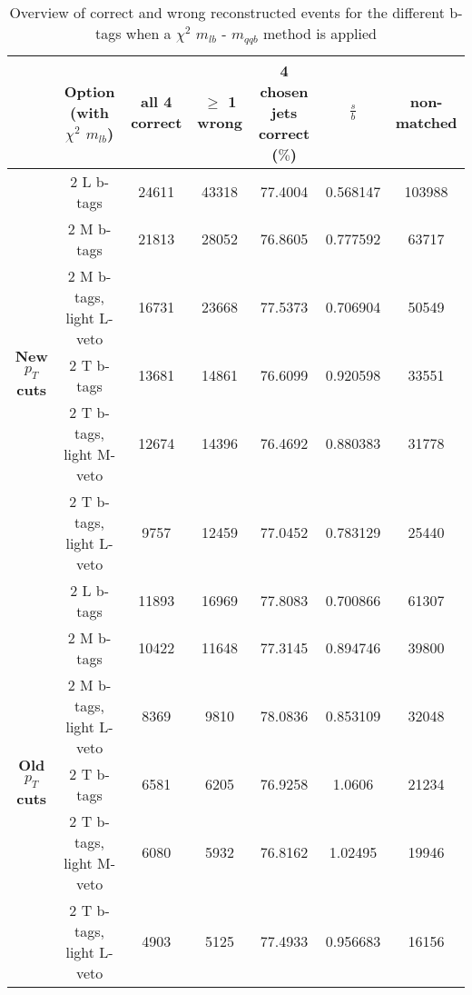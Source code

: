 \documentclass[a4paper,12pt]{report}
\begin{document}
\begin{landscape}
 \begin{table}[!h] 
 \begin{tabular}{c|c|c|c|c|c|c} 
&\textbf{Option} (with $\chi^{2}$ $m_{lb}$) & all 4 correct & $\geq$ 1 wrong & 4 chosen jets correct ($\%$) & $\frac{s}{b}$ & non-matched \\ \hline 
\multirow{6}{*}{\textbf{New $p_T$ cuts}}
& 2 L b-tags              & 24611 & 43318 & 77.4004 & 0.568147 & 103988 \\ 
& 2 M b-tags              & 21813 & 28052 & 76.8605 & 0.777592 & 63717 \\ 
& 2 M b-tags, light L-veto & 16731 & 23668 & 77.5373 & 0.706904 & 50549 \\ 
& 2 T b-tags              & 13681 & 14861 & 76.6099 & 0.920598 & 33551 \\ 
& 2 T b-tags, light M-veto & 12674 & 14396 & 76.4692 & 0.880383 & 31778 \\ 
& 2 T b-tags, light L-veto & 9757 & 12459 & 77.0452 & 0.783129 & 25440 \\ 
\hline
\multirow{6}{*}{\textbf{Old $p_T$ cuts}} 
& 2 L b-tags              & 11893 & 16969 & 77.8083 & 0.700866 & 61307 \\ 
& 2 M b-tags              & 10422 & 11648 & 77.3145 & 0.894746 & 39800 \\ 
& 2 M b-tags, light L-veto & 8369 & 9810 & 78.0836 & 0.853109 & 32048 \\ 
& 2 T b-tags              & 6581 & 6205 & 76.9258 & 1.0606 & 21234 \\ 
& 2 T b-tags, light M-veto & 6080 & 5932 & 76.8162 & 1.02495 & 19946 \\ 
& 2 T b-tags, light L-veto & 4903 & 5125 & 77.4933 & 0.956683 & 16156 \\ 
 \end{tabular} 
 \caption{Overview of correct and wrong reconstructed events for the different b-tags when a $\chi^{2}$ $m_{lb}$ - $m_{qqb}$ method is applied} 
 \end{table} 
 

\end{landscape}
\end{document}
